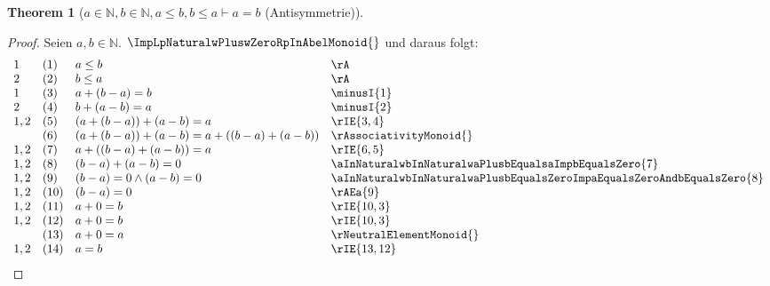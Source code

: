 \documentclass{book}
\theoremstyle{plain}
\newtheorem{theorem}{Theorem}
\theoremstyle{remark}
\theoremstyle{definition}
\begin{document}
\label{aInNaturalwbInNaturalwaLeqbwbLeqaImpaEqualsb}
\begin{theorem}[\(a\in\mathbb{N},b\in\mathbb{N},a\leq b,b\leq a\vdash a = b\) (Antisymmetrie)]
\end{theorem}
\begin{proof}
        Seien \(a,b\in\mathbb{N}\). \(\ImpLpNaturalwPluswZeroRpInAbelMonoid{}\) und daraus folgt:
        \[
	\begin{array}{llll}
            1       &  (1) & a\leq b & \rA \\
            2       &  (2) & b\leq a & \rA \\
            1       &  (3) & a+(b-a)=b & \minusI{1} \\
            2       &  (4) & b+(a-b)=a & \minusI{2} \\
            1,2     &  (5) & (a+(b-a))+(a-b)=a & \rIE{3,4} \\
                    &  (6) & (a+(b-a))+(a-b)=a+((b-a)+(a-b)) & \rAssociativityMonoid{} \\
            1,2     &  (7) & a+((b-a)+(a-b))=a & \rIE{6,5} \\
            1,2     &  (8) & (b-a)+(a-b)=0 & \aInNaturalwbInNaturalwaPlusbEqualsaImpbEqualsZero{7} \\     
            1,2     &  (9) & (b-a)=0\land (a-b)=0 & \aInNaturalwbInNaturalwaPlusbEqualsZeroImpaEqualsZeroAndbEqualsZero{8} \\
            1,2     &  (10) & (b-a)=0 & \rAEa{9} \\
            1,2     &  (11) & a+0=b & \rIE{10,3} \\
            1,2     &  (12) & a+0=b & \rIE{10,3} \\
                    &  (13) & a+0=a & \rNeutralElementMonoid{} \\
            1,2     &  (14) & a=b & \rIE{13,12} \\
    \end{array}
	\]
\end{proof}
\end{document}
